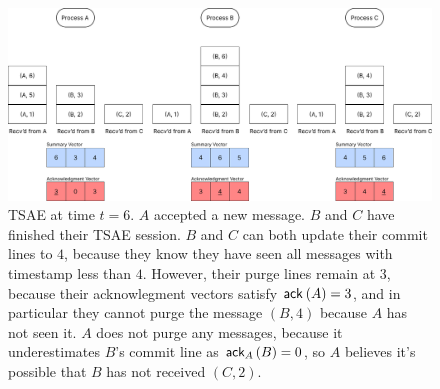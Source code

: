 \documentclass[]             %
{NASA}                       %
\theoremstyle{definition}
\begin{document}
\begin{landscape}
\begin{figure}[h]
    \label{fig:tsae5}
  \end{figure}
  \begin{figure}[h]
    \centering
    \includegraphics[width=1.4\textwidth]{images/tsae/TSAE6.png}
    \caption{TSAE at time $t=6$. $A$ accepted a new message. $B$ and $C$ have finished their TSAE session. $B$ and $C$ can both update their commit lines to $4$, because they know they have seen all messages with timestamp less than $4$. However, their purge lines remain at $3$, because their acknowlegment vectors satisfy $\textsf{ack}_{}\left(A\right) = 3$, and in particular they cannot purge the message $(B, 4)$ because $A$ has not seen it. $A$ does not purge any messages, because it underestimates $B$'s commit line as $\textsf{ack}_{A}\left(B\right) = 0$, so $A$ believes it's possible that $B$ has not received $(C, 2)$.}
    \label{fig:tsae6}
  \end{figure}


\end{landscape}
\end{document}
